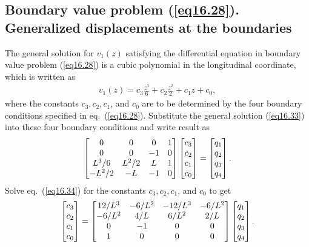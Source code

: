 \documentclass{AeroStructure-ERJohnson}
\begin{document}
\subsection{ Boundary value problem (\ref{eq16.28}). Generalized displacements at the boundaries}\label{sec16.2.1}

The general solution for $v_{1}(z)$ satisfying the differential equation in boundary value problem (\ref{eq16.28}) is a cubic polynomial in the longitudinal coordinate, which is written as
\begin{align}\label{eq16.33}
v_{1}(z)=c_{3} \frac{z^{3}}{6}+c_{2} \frac{z^{2}}{2}+c_{1} z+c_{0},
\end{align}
where the constants $c_{3}, c_{2}, c_{1}$, and $c_{0}$ are to be determined by the four boundary conditions specified in eq.~(\ref{eq16.28}). Substitute the general solution (\ref{eq16.33}) into these four boundary conditions and write result as
\begin{align}\label{eq16.34}
\left[\begin{array}{@{}cccc@{}}0 & 0 & 0 & 1 \\0 & 0 & -1 & 0 \\ L^{3} / 6 & L^{2} / 2 & L & 1 \\ -L^{2} / 2 & -L & -1 & 0\end{array}\right]\left[\begin{array}{@{}l@{}}c_{3} \\ c_{2} \\ c_{1} \\ c_{0}\end{array}\right]=\left[\begin{array}{@{}l@{}}q_{1} \\ q_{2} \\ q_{3} \\q_{4}\end{array}\right].
\end{align}
Solve eq.~(\ref{eq16.34}) for the constants $c_{3}, c_{2}, c_{1}$, and $c_{0}$ to get
\begin{align}\label{eq16.35}
\left[\begin{array}{@{}l@{}}c_{3} \\c_{2} \\c_{1} \\c_{0}\end{array}\right]=\left[\begin{array}{@{}cccc@{}}12 / L^{3} & -6 / L^{2} & -12 / L^{3} & -6 / L^{2} \\-6 / L^{2} & 4 / L & 6 / L^{2} & 2 / L \\0 & -1 & 0 & 0 \\1 & 0 & 0 & 0\end{array}\right]\left[\begin{array}{@{}l@{}}q_{1} \\q_{2} \\q_{3} \\q_{4}\end{array}\right].
\end{align}
\end{document}
